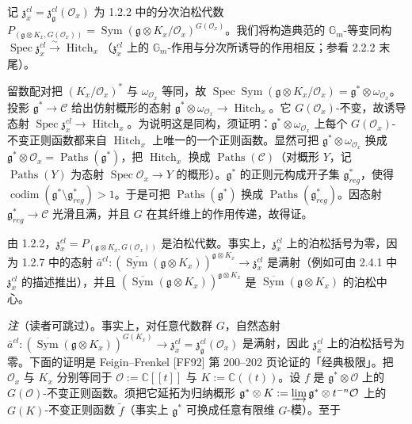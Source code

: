 
记 $\mathfrak{z}_x^{cl}=\mathfrak{z}_{\mathfrak{g}}^{cl}(\mathcal{O}_x)$ 为 1.2.2 中的分次泊松代数 $P_{(\mathfrak{g}\otimes K_x,G(\mathcal{O}_x))}=\operatorname{Sym}(\mathfrak{g}\otimes K_x/\mathcal{O}_x)^{G(\mathcal{O}_x)}$。我们将构造典范的 $\mathbb{G}_m$-等变同构 $\operatorname{Spec}\mathfrak{z}_x^{cl}\xrightarrow{\sim}\operatorname{Hitch}_x$（$\mathfrak{z}_x^{cl}$ 上的 $\mathbb{G}_m$-作用与分次所诱导的作用相反；参看 2.2.2 末尾）。

留数配对把 $(K_x/\mathcal{O}_x)^{*}$ 与 $\omega_{\mathcal{O}_x}$ 等同，故 $\operatorname{Spec}\operatorname{Sym}(\mathfrak{g}\otimes K_x/\mathcal{O}_x)=\mathfrak{g}^{*}\otimes\omega_{\mathcal{O}_x}$。投影 $\mathfrak{g}^{*}\to\mathcal{C}$ 给出仿射概形的态射 $\mathfrak{g}^{*}\otimes\omega_{\mathcal{O}_x}\to\operatorname{Hitch}_x$。它 $G(\mathcal{O}_x)$-不变，故诱导态射 $\operatorname{Spec}\mathfrak{z}_x^{cl}\to\operatorname{Hitch}_x$。为说明这是同构，须证明：$\mathfrak{g}^{*}\otimes\omega_{\mathcal{O}_x}$ 上每个 $G(\mathcal{O}_x)$-不变正则函数都来自 $\operatorname{Hitch}_x$ 上唯一的一个正则函数。显然可把 $\mathfrak{g}^{*}\otimes\omega_{\mathcal{O}_x}$ 换成 $\mathfrak{g}^{*}\otimes\mathcal{O}_x=\operatorname{Paths}(\mathfrak{g}^{*})$，把 $\operatorname{Hitch}_x$ 换成 $\operatorname{Paths}(\mathcal{C})$（对概形 $Y$，记 $\operatorname{Paths}(Y)$ 为态射 $\operatorname{Spec}\mathcal{O}_x\to Y$ 的概形）。$\mathfrak{g}^{*}$ 的正则元构成开子集 $\mathfrak{g}^{*}_{reg}$，使得 $\operatorname{codim}(\mathfrak{g}^{*}\setminus\mathfrak{g}^{*}_{reg})>1$。于是可把 $\operatorname{Paths}(\mathfrak{g}^{*})$ 换成 $\operatorname{Paths}(\mathfrak{g}^{*}_{reg})$。因态射 $\mathfrak{g}^{*}_{reg}\to\mathcal{C}$ 光滑且满，并且 $G$ 在其纤维上的作用传递，故得证。

 由 1.2.2，$\mathfrak{z}_x^{cl}=P_{(\mathfrak{g}\otimes K_x,G(\mathcal{O}_x))}$ 是泊松代数。事实上，$\mathfrak{z}_x^{cl}$ 上的泊松括号为零，因为 1.2.7 中的态射 $\bar{a}^{cl}:(\overline{\operatorname{Sym}}(\mathfrak{g}\otimes K_x))^{\mathfrak{g}\otimes K_x}\to\mathfrak{z}_x^{cl}$ 是满射（例如可由 2.4.1 中 $\mathfrak{z}_x^{cl}$ 的描述推出），并且 $(\overline{\operatorname{Sym}}(\mathfrak{g}\otimes K_x))^{\mathfrak{g}\otimes K_x}$ 是 $\overline{\operatorname{Sym}}(\mathfrak{g}\otimes K_x)$ 的泊松中心。

\emph{注}（读者可跳过）。事实上，对任意代数群 $G$，自然态射 $\bar{a}^{cl}:(\overline{\operatorname{Sym}}(\mathfrak{g}\otimes K_x))^{G(K_x)}\to\mathfrak{z}_x^{cl}=\mathfrak{z}_{\mathfrak{g}}^{cl}(\mathcal{O}_x)$ 是满射，因此 $\mathfrak{z}_x^{cl}$ 上的泊松括号为零。下面的证明是 Feigin--Frenkel [FF92] 第 200--202 页论证的「经典极限」。把 $\mathcal{O}_x$ 与 $K_x$ 分别等同于 $\mathcal{O}:=\mathbb{C}[[t]]$ 与 $K:=\mathbb{C}((t))$。设 $f$ 是 $\mathfrak{g}^{*}\otimes\mathcal{O}$ 上的 $G(\mathcal{O})$-不变正则函数。须把它延拓为归纳概形 $\mathfrak{g}^{*}\otimes K:=\varinjlim\mathfrak{g}^{*}\otimes t^{-n}\mathcal{O}$ 上的 $G(K)$-不变正则函数 $\tilde{f}$（事实上 $\mathfrak{g}^{*}$ 可换成任意有限维 $G$-模）。至于

